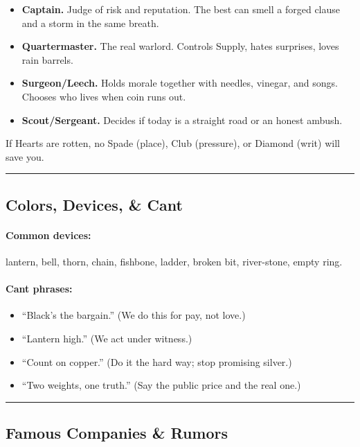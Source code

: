 \documentclass[11pt]{article}
\begin{document}
\begin{itemize}
    \item \textbf{Captain.} Judge of risk and reputation. The best can smell a forged clause and a storm in the same breath.
    
    \item \textbf{Quartermaster.} The real warlord. Controls Supply, hates surprises, loves rain barrels.
    
    \item \textbf{Surgeon/Leech.} Holds morale together with needles, vinegar, and songs. Chooses who lives when coin runs out.
    
    \item \textbf{Scout/Sergeant.} Decides if today is a straight road or an honest ambush.
\end{itemize}

If Hearts are rotten, no Spade (place), Club (pressure), or Diamond (writ) will save you.

\rule{\textwidth}{0.4pt}

\subsection*{Colors, Devices, \& Cant}

\paragraph{Common devices:} lantern, bell, thorn, chain, fishbone, ladder, broken bit, river-stone, empty ring.

\paragraph{Cant phrases:}
\begin{itemize}
    \item ``Black's the bargain.'' (We do this for pay, not love.)
    \item ``Lantern high.'' (We act under witness.)
    \item ``Count on copper.'' (Do it the hard way; stop promising silver.)
    \item ``Two weights, one truth.'' (Say the public price and the real one.)
\end{itemize}

\rule{\textwidth}{0.4pt}

\subsection*{Famous Companies \& Rumors}
\end{document}
